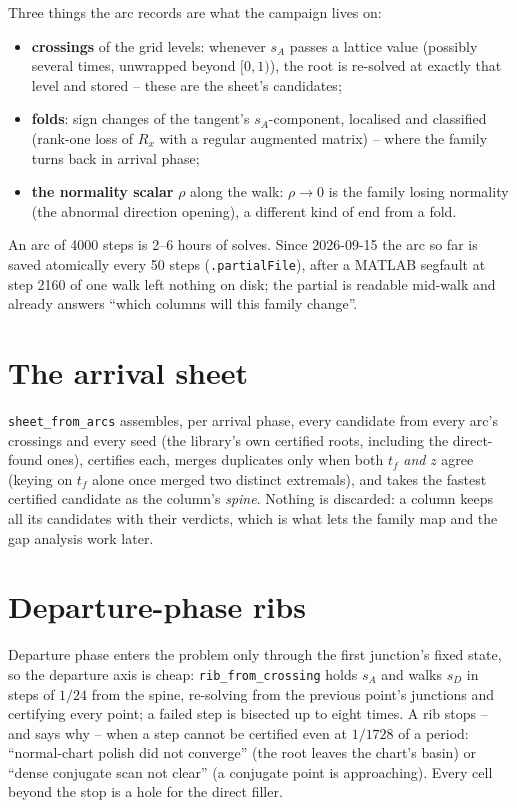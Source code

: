 \documentclass[11pt]{article}
\newcommand{\sD}{s_D}
\newcommand{\sA}{s_A}
\newcommand{\tf}{t_f}
\newcommand{\code}[1]{\texttt{#1}}
\begin{document}
Three things the arc records are what the campaign lives on:
\begin{itemize}[nosep]
\item \textbf{crossings} of the grid levels: whenever $\sA$ passes a
  lattice value (possibly several times, unwrapped beyond $[0,1)$), the
  root is re-solved at exactly that level and stored -- these are the
  sheet's candidates;
\item \textbf{folds}: sign changes of the tangent's $\sA$-component,
  localised and classified (rank-one loss of $R_x$ with a regular
  augmented matrix) -- where the family turns back in arrival phase;
\item \textbf{the normality scalar} $\rho$ along the walk: $\rho\to 0$ is
  the family losing normality (the abnormal direction opening), a
  different kind of end from a fold.
\end{itemize}
An arc of 4000 steps is 2--6 hours of solves. Since 2026-09-15 the arc
so far is saved atomically every 50 steps (\code{.partialFile}), after a
MATLAB segfault at step 2160 of one walk left nothing on disk; the partial
is readable mid-walk and already answers ``which columns will this family
change''.

\section{The arrival sheet}

\code{sheet\_from\_arcs} assembles, per arrival phase, every candidate from
every arc's crossings and every seed (the library's own certified roots,
including the direct-found ones), certifies each, merges duplicates only
when both $\tf$ \emph{and} $z$ agree (keying on $\tf$ alone once merged
two distinct extremals), and takes the fastest certified candidate as the
column's \emph{spine}. Nothing is discarded: a column keeps all its
candidates with their verdicts, which is what lets the family map and the
gap analysis work later.

\section{Departure-phase ribs}

Departure phase enters the problem only through the first junction's
fixed state, so the departure axis is cheap: \code{rib\_from\_crossing}
holds $\sA$ and walks $\sD$ in steps of $1/24$ from the spine, re-solving
from the previous point's junctions and certifying every point; a failed
step is bisected up to eight times. A rib stops -- and says why -- when a
step cannot be certified even at $1/1728$ of a period: ``normal-chart
polish did not converge'' (the root leaves the chart's basin) or ``dense
conjugate scan not clear'' (a conjugate point is approaching). Every cell
beyond the stop is a hole for the direct filler.
\end{document}

